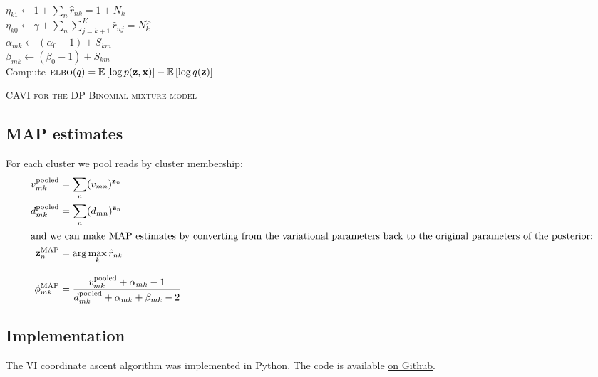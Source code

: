 \documentclass[11pt]{article}
\newcommand{\bx}{\ensuremath{\mathbf{x}}}
\newcommand{\bz}{\ensuremath{\mathbf{z}}}
\newcommand{\EE}[1]{\mathbb{E}\left[#1\right]}
\newcommand{\ELBO}{\textsc{elbo}}
\begin{document}
\begin{algorithm}[h]
{	\vspace{0.1cm}	
	 \\
		\hspace{1cm} $\eta_{k1} \leftarrow 1 + \sum_n \hat{r}_{nk} = 1 + N_k$ \\
		\hspace{1cm} $\eta_{k0} \leftarrow \gamma + \sum_n \sum_{j=k+1}^K \hat{r}_{nj} = N_k^>$\\
		\hspace{1cm} $\alpha_{mk} \leftarrow  (\alpha_0 - 1) + S_{km}$ \\
		\hspace{1cm} $ \beta_{mk} \leftarrow (\beta_0 - 1) + S_{km}$ \\
	\vspace{0.1cm}		
  Compute $\ELBO(q) = \EE{\log p(\bz, \bx)} - \EE{\log q(\bz)}$
}
\caption{\textsc{CAVI for the DP Binomial mixture model}}
\label{alg:cavi}

\end{algorithm}
\newpage
\subsection{MAP estimates}
For each cluster we pool reads by cluster membership:
\begin{align}
v_{mk}^{\text{pooled}} &= \sum_n (v_{mn})^{\bz_n} \\
d_{mk}^{\text{pooled}} &= \sum_n (d_{mn})^{\bz_n} \\
\intertext{and we can make MAP estimates by converting from the variational parameters back to the original parameters of the posterior:}
\bz_n^{\text{MAP}} &= \arg \max_k \hat{r}_{nk}  \\[8pt]
\phi_{mk}^{\text{MAP}} &= \frac{v_{mk}^{\text{pooled}} + \alpha_{mk} - 1}{d_{mk}^{\text{pooled}} + \alpha_{mk} + \beta_{mk} - 2}
\end{align}


\subsection{Implementation}
The VI coordinate ascent algorithm was implemented in Python. The code is available \href{https://github.com/daviddliu/thesis/tree/master/clustering}{on Github}.
\newpage
\end{document}

